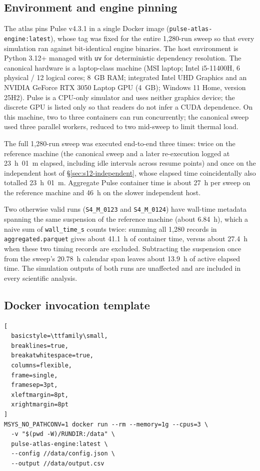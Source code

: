 \documentclass[pdflatex,sn-nature]{sn-jnl}%
\begin{document}
\subsection{Environment and engine pinning}\label{sec:s12-env}

The atlas pins Pulse v4.3.1 in a single Docker image (\texttt{pulse-atlas-engine:latest}), whose tag was fixed for the entire 1{,}280-run sweep so that every simulation ran against bit-identical engine binaries. The host environment is Python 3.12+ managed with \texttt{uv} for deterministic dependency resolution. The canonical hardware is a laptop-class machine (MSI laptop; Intel i5-11400H, 6 physical / 12 logical cores; 8~GB RAM; integrated Intel UHD Graphics and an NVIDIA GeForce RTX 3050 Laptop GPU (4~GB); Windows 11 Home, version 25H2). Pulse is a CPU-only simulator and uses neither graphics device; the discrete GPU is listed only so that readers do not infer a CUDA dependence. On this machine, two to three containers can run concurrently; the canonical sweep used three parallel workers, reduced to two mid-sweep to limit thermal load.

The full 1{,}280-run sweep was executed end-to-end three times: twice on the reference machine (the canonical sweep and a later re-execution logged at 23~h~01~m elapsed, including idle intervals across resume points) and once on the independent host of \S\ref{sec:s12-independent}, whose elapsed time coincidentally also totalled 23~h~01~m. Aggregate Pulse container time is about 27~h per sweep on the reference machine and 46~h on the slower independent host.

Two otherwise valid runs (\texttt{S4\_M\_0123} and \texttt{S4\_M\_0124}) have wall-time metadata spanning the same suspension of the reference machine (about 6.84~h), which a naive sum of \texttt{wall\_time\_s} counts twice: summing all 1{,}280 records in \texttt{aggregated.parquet} gives about 41.1~h of container time, versus about 27.4~h when these two timing records are excluded. Subtracting the suspension once from the sweep's 20.78~h calendar span leaves about 13.9~h of active elapsed time. The simulation outputs of both runs are unaffected and are included in every scientific analysis.

\subsection{Docker invocation template}\label{sec:s12-docker}

\begin{lstlisting}[
  basicstyle=\ttfamily\small,
  breaklines=true,
  breakatwhitespace=true,
  columns=flexible,
  frame=single,
  framesep=3pt,
  xleftmargin=8pt,
  xrightmargin=8pt
]
MSYS_NO_PATHCONV=1 docker run --rm --memory=1g --cpus=3 \
  -v "$(pwd -W)/RUNDIR:/data" \
  pulse-atlas-engine:latest \
  --config //data/config.json \
  --output //data/output.csv
\end{lstlisting}
\end{document}
